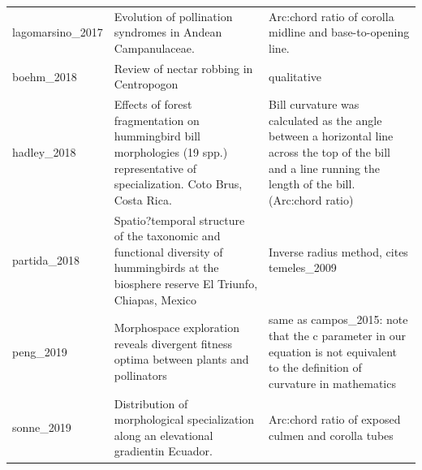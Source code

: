 \documentclass[]{article}
\begin{document}
\begin{longtable}[]{@{}lll@{}}
lagomarsino\_2017 & Evolution of pollination syndromes in Andean
Campanulaceae. & Arc:chord ratio of corolla midline and base-to-opening
line.\tabularnewline
boehm\_2018 & Review of nectar robbing in Centropogon &
qualitative\tabularnewline
hadley\_2018 & Effects of forest fragmentation on hummingbird bill
morphologies (19 spp.) representative of specialization. Coto Brus,
Costa Rica. & Bill curvature was calculated as the angle between a
horizontal line across the top of the bill and a line running the length
of the bill. (Arc:chord ratio)\tabularnewline
partida\_2018 & Spatio?temporal structure of the taxonomic and
functional diversity of hummingbirds at the biosphere reserve El
Triunfo, Chiapas, Mexico & Inverse radius method, cites
temeles\_2009\tabularnewline
peng\_2019 & Morphospace exploration reveals divergent fitness optima
between plants and pollinators & same as campos\_2015: note that the c
parameter in our equation is not equivalent to the definition of
curvature in mathematics\tabularnewline
sonne\_2019 & Distribution of morphological specialization along an
elevational gradientin Ecuador. & Arc:chord ratio of exposed culmen and
corolla tubes\tabularnewline
\bottomrule
\end{longtable}
\end{document}
